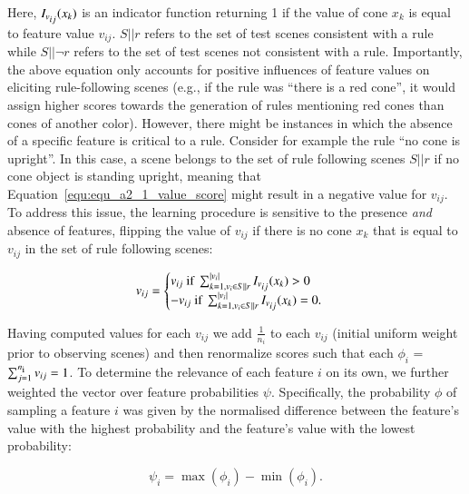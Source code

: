 \documentclass[doc,natbib,floatsintext]{apa7}
\begin{document}
\begin{appendices}
Here, \({I}_{v\textsubscript{$ij$}}(x_{k})\) is an indicator function returning 1 if the value of cone \(x_{k}\) is equal to feature value \(v_{ij}\). \(S||r\) refers to the set of test scenes consistent with a rule while \(S||\neg r\) refers to the set of test scenes not consistent with a rule. Importantly, the above equation only accounts for positive influences of feature values on eliciting rule-following scenes (e.g., if the rule was ``there is a red cone'', it would assign higher scores towards the generation of rules mentioning red cones than cones of another color). However, there might be instances in which the absence of a specific feature is critical to a rule. Consider for example the rule ``no cone is upright''. In this case, a scene belongs to the set of rule following scenes \(S||r\) if no cone object is standing upright, meaning that Equation~\ref{equ:equ_a2_1_value_score} might result in a negative value for \(v_{ij}\). To address this issue, the learning procedure is sensitive to the presence \textit{and} absence of features, flipping the value of \(v_{ij}\) if there is no cone \(x_{k}\) that is equal to \(v_{ij}\) in the set of rule following scenes: 


\begin{equation}
    v_{ij} = \begin{cases}
    v_{ij}  \text{ if }\sum_{k = 1, v_{i} \in S||r}^{|v_{i}|}{I}_{v\textsubscript{$ij$}}(x_{k}) > 0\\
    -v_{ij}  \text{ if }\sum_{k = 1, v_{i} \in S||r}^{|v_{i}|}{I}_{v\textsubscript{$ij$}}(x_{k}) = 0. 
    \end{cases}
\label{equ:equ_a2_2_value_score_2}
\end{equation}

Having computed values for each \(v_{ij}\) we add \(\frac{1}{n_{i}}\) to each  \(v_{ij}\) (initial uniform weight prior to observing scenes) and then renormalize scores such that each \(\phi_{i}\) =  \(\sum_{j=1}^{n\textsubscript{i}} v_{ij} = 1\). To determine the relevance of each feature \(i\) on its own, we further weighted the vector over feature probabilities \textbf{\(\psi\)}. Specifically, the probability $\phi$ of sampling a feature $i$ was given by the normalised difference between the feature's value with the highest probability and the feature's value with the lowest probability:


\begin{equation}
    \psi_{i} = \max(\phi_{i}) - \min(\phi_{i}).
\label{equ:equ_a2_3_feat_score}
\end{equation}


\end{appendices}
\end{document}
